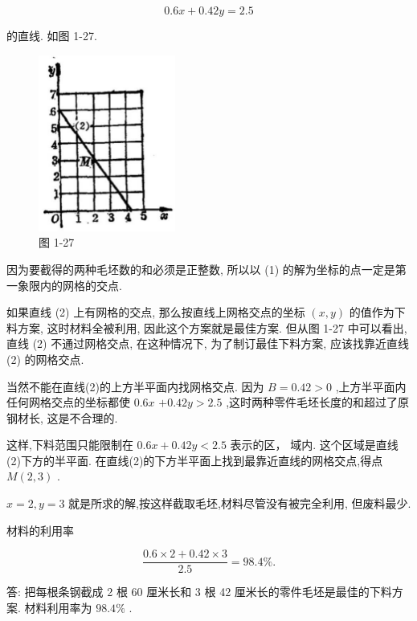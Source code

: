 \documentclass[lang=cn,newtx,10pt,scheme=chinese]{elegantbook}
\begin{document}
\[
    {0.6x} + {0.42y} = {2.5} \tag{2}
\]

的直线. 如图 1-27.

\begin{figure}[h]
  \centering
  \includegraphics[max width=0.4\textwidth]{images/01912cc2-ffb6-728e-9ae7-b113ff05c64b_35_684997.jpg}
  \caption{图 1-27}
\end{figure}



因为要截得的两种毛坯数的和必须是正整数, 所以以 (1) 的解为坐标的点一定是第一象限内的网格的交点.

如果直线 (2) 上有网格的交点, 那么按直线上网格交点的坐标 \(\left( {x,y}\right)\) 的值作为下料方案, 这时材料全被利用, 因此这个方案就是最佳方案. 但从图 1-27 中可以看出, 直线 (2) 不通过网格交点, 在这种情况下, 为了制订最佳下料方案, 应该找靠近直线 (2) 的网格交点.

当然不能在直线(2)的上方半平面内找网格交点. 因为 \(B = {0.42} > 0\) ,上方半平面内任何网格交点的坐标都使 \({0.6x}\) \(+ {0.42y} > {2.5}\) ,这时两种零件毛坯长度的和超过了原钢材长, 这是不合理的.

这样,下料范围只能限制在 \({0.6x} + {0.42y} < {2.5}\) 表示的区， 域内. 这个区域是直线(2)下方的半平面. 在直线(2)的下方半平面上找到最靠近直线的网格交点,得点 \(M\left( {2,3}\right)\) .

\(x = 2,y = 3\) 就是所求的解,按这样截取毛坯,材料尽管没有被完全利用, 但废料最少.

材料的利用率

\[
  \frac{{0.6} \times 2 + {0.42} \times 3}{2.5} = {98.4}\% \text{.}
\]

答: 把每根条钢截成 2 根 60 厘米长和 3 根 42 厘米长的零件毛坯是最佳的下料方案. 材料利用率为 \({98.4}\%\) .
\end{document}
